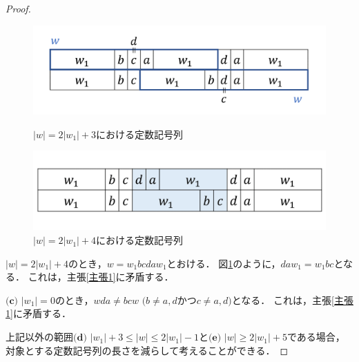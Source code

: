 \begin{proof}
\begin{figure}
  \centering
  \includegraphics[width=\linewidth]{figs/w=2w_1+3.png}
  \vspace{-1cm}
  \caption{$|w| = 2|w_{1}|+3$における定数記号列}
  \label{追加部分11}
  \vspace*{.5cm}
  \centering
  \includegraphics[width=\linewidth]{figs/w=2w_1+4.png}
  \vspace{-1.2cm}
  \caption{$|w| = 2|w_{1}|+4$における定数記号列}
  \label{追加部分10}
  
  \end{figure}
  
  $|w|=2|w_{1}|+4$のとき，$w=w_{1}bcdaw_{1}$とおける．
  図\ref{追加部分10}のように，$daw_{1}=w_{1}bc$となる．
  これは，主張\ref{主張1}に矛盾する．
  
  \noindent$\textbf{(c)}$ $|w_{1}|=0$のとき，$wda \not = bcw$ $(b \not = a,d$かつ$c \not = a,d)$となる．
  これは，主張\ref{主張1}に矛盾する．
  
  上記以外の範囲$\textbf{(d)}$ $|w_{1}|+3 \le |w| \le 2|w_{1}|-1$と$\textbf{(e)}$ $|w| \ge 2|w_{1}|+5$である場合，対象とする定数記号列の長さを減らして考えることができる．
  

\end{proof}
